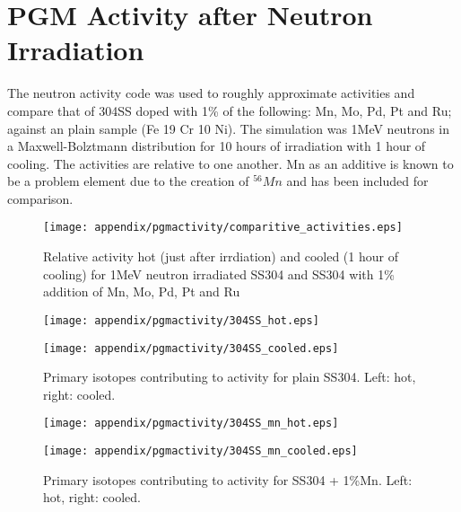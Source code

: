 \chapter{PGM Activity after Neutron Irradiation}
\label{section:pgmactivity}

The neutron activity code was used to roughly approximate activities and compare that of 304SS doped with 1\% of the following: Mn, Mo, Pd, Pt and Ru; against an plain sample (Fe 19 Cr 10 Ni).  The simulation was 1MeV neutrons in a Maxwell-Bolztmann distribution for 10 hours of irradiation with 1 hour of cooling.  The activities are relative to one another.  Mn as an additive is known to be a problem element due to the creation of ${}^{56}Mn$ and has been included for comparison.

\begin{figure}
\centering
\begin{minipage}{0.8\textwidth}
\texttt{[image: appendix/pgmactivity/comparitive\_activities.eps]}
\end{minipage}
\caption{Relative activity hot (just after irrdiation) and cooled (1 hour of cooling) for 1MeV neutron irradiated SS304 and SS304 with 1\% addition of Mn, Mo, Pd, Pt and Ru}
\label{fig:relativeactivitiesSS304}
\end{figure}

\begin{figure}
\centering
\begin{minipage}{.49\textwidth}
\texttt{[image: appendix/pgmactivity/304SS\_hot.eps]}
\end{minipage}
\begin{minipage}{.49\textwidth}
\texttt{[image: appendix/pgmactivity/304SS\_cooled.eps]}
\end{minipage}
\caption{Primary isotopes contributing to activity for plain SS304. Left: hot, right: cooled.}
\label{fig:activity304SS}
\end{figure}


\begin{figure}
\centering
\begin{minipage}{.49\textwidth}
\texttt{[image: appendix/pgmactivity/304SS\_mn\_hot.eps]}
\end{minipage}
\begin{minipage}{.49\textwidth}
\texttt{[image: appendix/pgmactivity/304SS\_mn\_cooled.eps]}
\end{minipage}
\caption{Primary isotopes contributing to activity for SS304 + 1\%Mn. Left: hot, right: cooled.}
\label{fig:activity304SSmn}
\end{figure}

